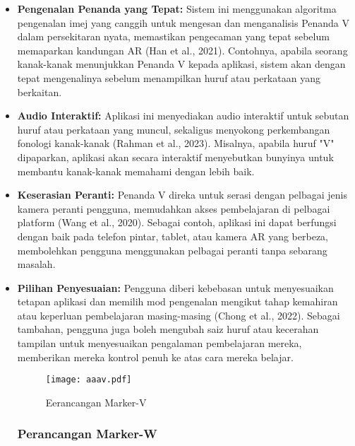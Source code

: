 \begin{itemize}
\begin{itemize}
\begin{itemize}
\begin{itemize}
\begin{itemize}
\item \textbf{Pengenalan Penanda yang Tepat:} Sistem ini menggunakan algoritma pengenalan imej yang canggih untuk mengesan dan menganalisis Penanda V dalam persekitaran nyata, memastikan pengecaman yang tepat sebelum memaparkan kandungan AR (Han et al., 2021). Contohnya, apabila seorang kanak-kanak menunjukkan Penanda V kepada aplikasi, sistem akan dengan tepat mengenalinya sebelum menampilkan huruf atau perkataan yang berkaitan.  \\
\item \textbf{Audio Interaktif:} Aplikasi ini menyediakan audio interaktif untuk sebutan huruf atau perkataan yang muncul, sekaligus menyokong perkembangan fonologi kanak-kanak (Rahman et al., 2023). Misalnya, apabila huruf "V" dipaparkan, aplikasi akan secara interaktif menyebutkan bunyinya untuk membantu kanak-kanak memahami dengan lebih baik.\\  
\item \textbf{Keserasian Peranti:} Penanda V direka untuk serasi dengan pelbagai jenis kamera peranti pengguna, memudahkan akses pembelajaran di pelbagai platform (Wang et al., 2020). Sebagai contoh, aplikasi ini dapat berfungsi dengan baik pada telefon pintar, tablet, atau kamera AR yang berbeza, membolehkan pengguna menggunakan pelbagai peranti tanpa sebarang masalah.  \\
\item \textbf{Pilihan Penyesuaian:} Pengguna diberi kebebasan untuk menyesuaikan tetapan aplikasi dan memilih mod pengenalan mengikut tahap kemahiran atau keperluan pembelajaran masing-masing (Chong et al., 2022). Sebagai tambahan, pengguna juga boleh mengubah saiz huruf atau kecerahan tampilan untuk menyesuaikan pengalaman pembelajaran mereka, memberikan mereka kontrol penuh ke atas cara mereka belajar. \\ 


\clearpage
\begin{figure}[h]
     \centering
     \texttt{[image: aaav.pdf]}
     \caption{Eerancangan Marker-V}
     \label{fig:enterv}
 \end{figure}
 
\clearpage


\subsubsection{Perancangan Marker-W}
 

\end{itemize}
\end{itemize}
\end{itemize}
\end{itemize}
\end{itemize}
